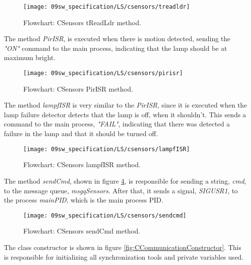 \begin{figure}[H]
	\centering
	\texttt{[image: 09sw\_specification/LS/csensors/treadldr]}
	\caption{Flowchart: CSensors tReadLdr method.}
	\label{fig:CSensorstreadldr}
\end{figure}

\clearpage
The method \textit{PirISR}, is executed when there is motion detected, sending the \textit{"ON"} command to the main process, indicating that the lamp should be at maximum bright.

\begin{figure}[H]
	\centering
	\texttt{[image: 09sw\_specification/LS/csensors/pirisr]}
	\caption{Flowchart: CSensors PirISR method.}
	\label{fig:CSensorspirisr}
\end{figure}

The method \textit{lampfISR} is very similar to the \textit{PirISR}, since it is executed when the lamp failure detector detects that the lamp is off, when it shouldn't. This sends a command to the main process, \textit{"FAIL"}, indicating that there was detected a failure in the lamp and that it should be turned off.

\begin{figure}[H]
	\centering
	\texttt{[image: 09sw\_specification/LS/csensors/lampfISR]}
	\caption{Flowchart: CSensors lampfISR method.}
	\label{fig:CSensorstreadlampf}
\end{figure}

\clearpage
The method \textit{sendCmd}, shown in figure \ref{fig:CSensorssendcmd}, is responsible for sending a string, \textit{cmd}, to the message queue, \textit{msgqSensors}. After that, it sends a signal, \textit{SIGUSR1}, to the process \textit{mainPID}, which is the main process PID.

\begin{figure}[H]
	\centering
	\texttt{[image: 09sw\_specification/LS/csensors/sendcmd]}
	\caption{Flowchart: CSensors sendCmd method.}
	\label{fig:CSensorssendcmd}
\end{figure}

\clearpage
{}

The class constructor is shown in figure \ref{fig:CCommunicationConstructor}. This is responsible for initializing all synchronization tools and private variables used.

